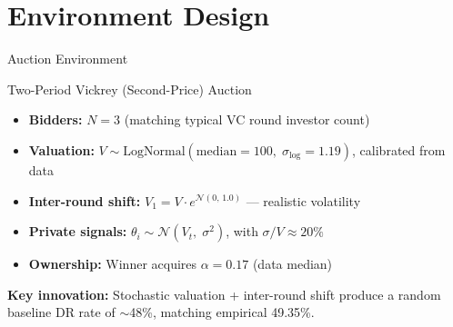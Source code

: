 \documentclass[aspectratio=169]{beamer}
\begin{document}
\section{Environment Design}

\begin{frame}{Auction Environment}
  \begin{block}{Two-Period Vickrey (Second-Price) Auction}
    \begin{itemize}
      \item \textbf{Bidders:} $N=3$ (matching typical VC round investor count)
      \item \textbf{Valuation:} $V \sim \text{LogNormal}(\text{median}=100,\;\sigma_{\log}=1.19)$, calibrated from data
      \item \textbf{Inter-round shift:} $V_1 = V \cdot e^{\mathcal{N}(0,\,1.0)}$ --- realistic volatility
      \item \textbf{Private signals:} $\theta_i \sim \mathcal{N}(V_t,\;\sigma^2)$, with $\sigma/V \approx 20\%$
      \item \textbf{Ownership:} Winner acquires $\alpha = 0.17$ (data median)
    \end{itemize}
  \end{block}

  \vspace{0.3cm}
  \textbf{Key innovation:} Stochastic valuation + inter-round shift produce a random baseline DR rate of $\sim$48\%, matching empirical 49.35\%.
\end{frame}
\end{document}
